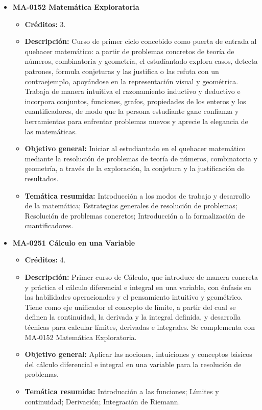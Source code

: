 \begin{itemize}[leftmargin=1.3em, itemsep=10pt, topsep=4pt, label={\color{Azul-UCR}$\blacksquare$}]
\item {\color{Azul-UCR}\textbf{MA-0152 Matemática Exploratoria}}\par\nopagebreak\smallskip
\begin{itemize}[leftmargin=1.1em, itemsep=3pt, topsep=2pt, parsep=2pt, label={\textendash}]
\item \textbf{Créditos:} 3.
\item \textbf{Descripción:} Curso de primer ciclo concebido como puerta de entrada al quehacer matemático: a partir de problemas concretos de teoría de números, combinatoria y geometría, el estudiantado explora casos, detecta patrones, formula conjeturas y las justifica o las refuta con un contraejemplo, apoyándose en la representación visual y geométrica. Trabaja de manera intuitiva el razonamiento inductivo y deductivo e incorpora conjuntos, funciones, grafos, propiedades de los enteros y los cuantificadores, de modo que la persona estudiante gane confianza y herramientas para enfrentar problemas nuevos y aprecie la elegancia de las matemáticas.
\item \textbf{Objetivo general:} Iniciar al estudiantado en el quehacer matemático mediante la resolución de problemas de teoría de números, combinatoria y geometría, a través de la exploración, la conjetura y la justificación de resultados.
\item \textbf{Temática resumida:} Introducción a los modos de trabajo y desarrollo de la matemática; Estrategias generales de resolución de problemas; Resolución de problemas concretos; Introducción a la formalización de cuantificadores.
\end{itemize}

\item {\color{Azul-UCR}\textbf{MA-0251 Cálculo en una Variable}}\par\nopagebreak\smallskip
\begin{itemize}[leftmargin=1.1em, itemsep=3pt, topsep=2pt, parsep=2pt, label={\textendash}]
\item \textbf{Créditos:} 4.
\item \textbf{Descripción:} Primer curso de Cálculo, que introduce de manera concreta y práctica el cálculo diferencial e integral en una variable, con énfasis en las habilidades operacionales y el pensamiento intuitivo y geométrico. Tiene como eje unificador el concepto de límite, a partir del cual se definen la continuidad, la derivada y la integral definida, y desarrolla técnicas para calcular límites, derivadas e integrales. Se complementa con MA-0152 Matemática Exploratoria.
\item \textbf{Objetivo general:} Aplicar las nociones, intuiciones y conceptos básicos del cálculo diferencial e integral en una variable para la resolución de problemas.
\item \textbf{Temática resumida:} Introducción a las funciones; Límites y continuidad; Derivación; Integración de Riemann.
\end{itemize}


\end{itemize}
